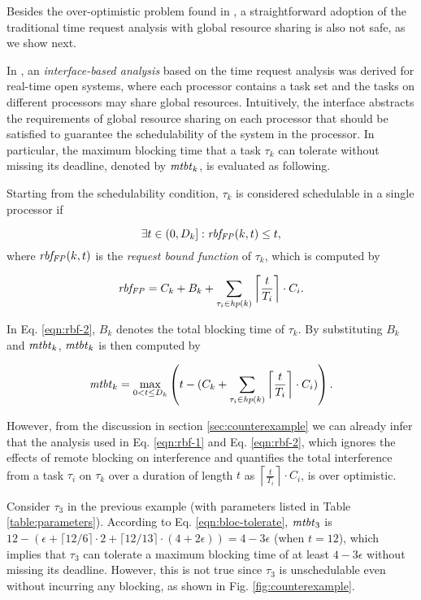 Besides the over-optimistic problem found in \cite{lakshmanan-2009}, a straightforward adoption of the traditional time request analysis with global resource sharing is also not safe, as we show next.

 In \cite{NBN:11}, an \emph{interface-based analysis} based on the time request analysis was derived for real-time open systems, where each processor contains a task set and the tasks on different processors may share global resources. Intuitively, the interface abstracts the requirements of global resource sharing on each processor that should be satisfied to guarantee the schedulability of the system in the processor. In particular, the maximum blocking time that a task $\tau_k$ can tolerate without missing its deadline, denoted by $\mathit{mtbt}_k$, is evaluated as following. 

Starting from the schedulability condition, $\tau_k$ is considered schedulable in a single processor if

\begin{equation}
\label{eqn:rbf-1}
\exists t \in (0,D_k]: \mathit{rbf_{FP}}(k,t) \leq t, 
\end{equation}
where $\mathit{rbf_{FP}}(k,t)$ is the \emph{request bound function} of $\tau_k$, which is computed by

\begin{equation}
\label{eqn:rbf-2}
\mathit{rbf_{FP}} = C_k + B_k + \sum_{\tau_i \in \mathit{hp}(k)} \left \lceil \frac{t}{T_i} \right \rceil \cdot C_i.
\end{equation}

In Eq. \ref{eqn:rbf-2}, $B_k$ denotes the total blocking time of $\tau_k$. By substituting $B_k$ and $\mathit{mtbt}_k$, $\mathit{mtbt}_k$ is then computed by

\begin{equation}
\label{eqn:bloc-tolerate}
\mathit{mtbt}_k = \max_{0<t \leq D_k} \left( t - ( C_k + \sum_{\tau_i \in \mathit{hp}(k)} \left \lceil \frac{t}{T_i} \right \rceil \cdot C_i ) \right).
\end{equation}

However, from the discussion in section \ref{sec:counterexample} we can already infer that the analysis used in Eq. \ref{eqn:rbf-1} and Eq. \ref{eqn:rbf-2}, which ignores the effects of remote blocking on interference and quantifies the total interference from a task $\tau_i$ on $\tau_k$ over a duration of length $t$ as $\left \lceil \frac{t}{T_i} \right \rceil \cdot C_i$, is over optimistic. 

Consider $\tau_3$ in the previous example (with parameters listed in Table \ref{table:parameters}). According to Eq. \ref{eqn:bloc-tolerate}, $\mathit{mtbt}_3$ is $12 - (\epsilon + \lceil 12 / 6 \rceil \cdot 2 + \lceil 12 / 13 \rceil \cdot (4+2\epsilon)) = 4-3\epsilon$ (when $t=12$), which implies that $\tau_3$ can tolerate a maximum blocking time of at least $4-3\epsilon$ without missing its deadline. However, this is not true since $\tau_3$ is unschedulable even without incurring any blocking, as shown in Fig. \ref{fig:counterexample}.

